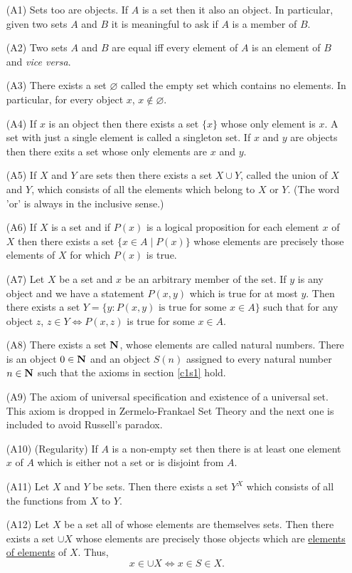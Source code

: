 \begin{enumerate}
\item[(A1)] Sets too are objects. If $A$ is a set then it also an object.
In particular, given two sets $A$ and $B$ it is meaningful to ask if $A$
is a member of $B$.
\item[(A2)] Two sets $A$ and $B$ are equal iff every element of $A$ is an
element of $B$ and \emph{vice versa}.
\item[(A3)] There exists a set $\varnothing$ called the empty set which
contains no elements. In particular, for every object $x$, $x \notin 
\varnothing$.
\item[(A4)] If $x$ is an object then there exists a set $\{x\}$ whose only
element is $x$. A set with just a single element is called a singleton set.
If $x$ and $y$ are objects then there exits a set whose only elements are
$x$ and $y$.
\item[(A5)] If $X$ and $Y$ are sets then there exists a set $X \cup Y$, 
called the union of $X$ and $Y$, which consists of all the elements which
belong to $X$ or $Y$. (The word 'or' is always in the inclusive sense.)
\item[(A6)] If $X$ is a set and if $P(x)$ is a logical proposition for 
each element $x$ of $X$ then there exists a set $\{x \in A \;|\; P(x)\}$
whose elements are precisely those elements of $X$ for which $P(x)$ is 
true.
\item[(A7)] Let $X$ be a set and $x$ be an arbitrary member of the set.
If $y$ is any object and we have a statement $P(x, y)$ which is true for
at most $y$. Then there exists a set $Y = \{y: P(x, y) \text{ is true for 
some } x \in A\}$ such that for any object $z$, $z \in Y \Leftrightarrow
P(x, z)$ is true for some $x \in A$.
\item[(A8)] There exists a set $\mathbf{N}$, whose elements are called natural
numbers. There is an object $0 \in \mathbf{N}$ and an object $S(n)$ assigned to
every natural number $n \in \mathbf{N}$ such that the axioms in section 
\ref{c1s1} hold.
\item[(A9)] The axiom of universal specification and existence of a 
universal set. This axiom is dropped in Zermelo-Frankael Set Theory and
the next one is included to avoid Russell's paradox.
\item[(A10)] (Regularity) If $A$ is a non-empty set then there is at least 
one element $x$ of $A$ which is either not a set or is disjoint from $A$.
\item[(A11)] Let $X$ and $Y$ be sets. Then there exists a set $Y^{X}$ which
consists of all the functions from $X$ to $Y$.
\item[(A12)] Let $X$ be a set all of whose elements are themselves sets.
Then there exists a set $\cup X$ whose elements are precisely those objects
which are \underline{elements of elements} of $X$. Thus,
\[
x \in \cup X \Leftrightarrow x \in S \in X.
\]
\end{enumerate}

